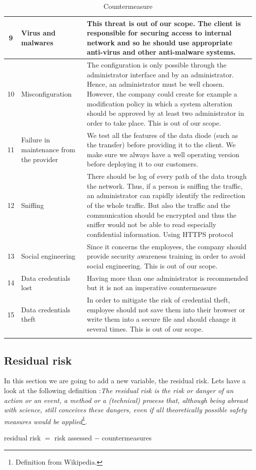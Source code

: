 \documentclass[a4paper,10pt]{article}
\begin{document}
\begin{longtable}{|c|p{2.5cm}|p{12cm}|}
\hline
9 & Virus and malwares & This threat is out of our scope. The client is responsible for securing access to internal network and so he should use appropriate anti-virus and other anti-malware systems.  \\
\hline
10 & Misconfiguration & The configuration is only possible through the administrator interface and by an administrator. Hence, an administrator must be well chosen. However, the company could create for example a modification policy in which a system alteration should be approved by at least two administrator in order to take place. This is out of our scope.  \\
\hline
11 & Failure in maintenance from the provider & We test all the features of the data diode (such as the transfer) before providing it to the client. We make sure we always have a well operating version before deploying it to our customers. \\
\hline
12 & Sniffing & There should be log of every path of the data trough the network. Thus, if a person is sniffing the traffic, an administrator can rapidly identify the redirection of the whole traffic. But also the traffic and the communication should be encrypted and thus the sniffer would not be able to read especially confidential information. Using HTTPS protocol \\
\hline
13 & Social engineering & Since it concerns the employees, the company should provide security awareness training in order to avoid social engineering. This is out of our scope.  \\
\hline
14 & Data credentials lost & Having more than one administrator is recommended but it is not an imperative countermeasure \\
\hline
15 & Data credentials theft & In order to mitigate the risk of credential theft, employee should not save them into their browser or write them into a secure file and should change it several times. This is out of our scope.\\
\hline
\caption{Countermeasure}
\label{tab:contermesure}
\end{longtable}

\subsection{Residual risk}

In this section we are going to add a new variable, the residual risk. Lets have a look at the following definition :\emph{The residual risk is the risk or danger of an action or an event, a method or a (technical) process that, although being abreast with science, still conceives these dangers, even if all theoretically possible safety measures would be applied}\footnote{Definition from Wikipedia.}.
\begin{center}
residual risk $=$ risk assessed $-$ countermeasures
\end{center}
\end{document}
